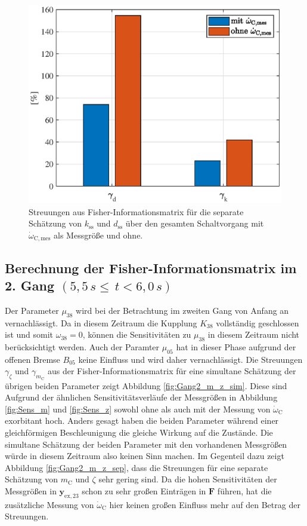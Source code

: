 \begin{figure}[ht]
  \centering
 \includegraphics[scale=0.9]{figures/03_Sensitivitaetsanalyse/03_Fisher_Info/d_k_separately.eps}
  \caption{Streuungen aus Fisher-Informationsmatrix für die separate Schätzung von $k_\mathrm{ss}$ und $d_\mathrm{ss}$ über den gesamten Schaltvorgang mit $\dot{\omega}_\mathrm{C,mes}$ als Messgröße und ohne.}
  \label{fig:Streuung_k_d}
  \end{figure} 

\subsection{Berechnung der Fisher-Informationsmatrix im 2. Gang $(5,5\, s\leq\, t<6,0\, s )$}\label{ssec:FI2Gang}
Der Parameter $\mu_{38}$ wird bei der Betrachtung im zweiten Gang von Anfang an vernachlässigt. Da in diesem Zeitraum die Kupplung $K_{38}$ vollständig geschlossen ist und somit $\omega_{38} = 0$, können die Sensitivitäten zu $\mu_{38}$ in diesem Zeitraum nicht berücksichtigt werden. Auch der Paramter $\mu_{05}$ hat in dieser Phase aufgrund der offenen Bremse $B_{05}$ keine Einfluss und wird daher vernachlässigt. Die Streuungen $\gamma_{\zeta}$ und $\gamma_{m_\mathrm{C}}$ aus der Fisher-Informationsmatrix für eine simultane Schätzung der übrigen beiden Parameter zeigt Abbildung \ref{fig:Gang2_m_z_sim}. Diese sind Aufgrund der ähnlichen Sensitivitätsverläufe der Messgrößen in Abbildung \ref{fig:Sens_m} und \ref{fig:Sens_z} sowohl ohne als auch mit der Messung von $\dot{\omega}_\mathrm{C}$ exorbitant hoch. Anders gesagt haben die beiden Parameter während einer gleichförmigen Beschleunigung die gleiche Wirkung auf die Zustände. Die simultane Schätzung der beiden Parameter mit den vorhandenen Messgrößen würde in diesem Zeitraum also keinen Sinn machen. Im Gegenteil dazu zeigt Abbildung \ref{fig:Gang2_m_z_sep}, dass die Streuungen für eine separate Schätzung von $m_\mathrm{C}$ und $\zeta$ sehr gering sind. Da die hohen Sensitivitäten der Messgrößen in $\pmb{y}_\mathrm{ex,23}$ schon zu sehr großen Einträgen in  $\pmb{F}$ führen, hat die zusätzliche Messung von $\dot{\omega}_\mathrm{C}$ hier keinen großen Einfluss mehr auf den Betrag der Streuungen.


